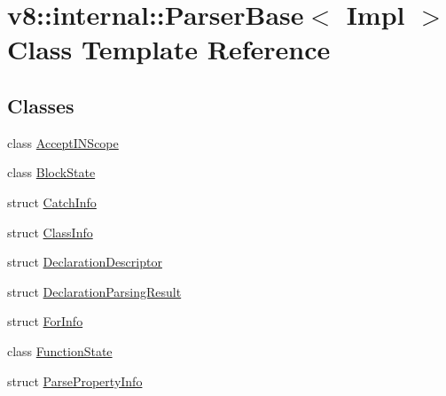 \hypertarget{classv8_1_1internal_1_1ParserBase}{}\section{v8\+:\+:internal\+:\+:Parser\+Base$<$ Impl $>$ Class Template Reference}
\label{classv8_1_1internal_1_1ParserBase}
\subsection*{Classes}
\begin{DoxyCompactItemize}
\item 
class \mbox{\hyperlink{classv8_1_1internal_1_1ParserBase_1_1AcceptINScope}{Accept\+I\+N\+Scope}}
\item 
class \mbox{\hyperlink{classv8_1_1internal_1_1ParserBase_1_1BlockState}{Block\+State}}
\item 
struct \mbox{\hyperlink{structv8_1_1internal_1_1ParserBase_1_1CatchInfo}{Catch\+Info}}
\item 
struct \mbox{\hyperlink{structv8_1_1internal_1_1ParserBase_1_1ClassInfo}{Class\+Info}}
\item 
struct \mbox{\hyperlink{structv8_1_1internal_1_1ParserBase_1_1DeclarationDescriptor}{Declaration\+Descriptor}}
\item 
struct \mbox{\hyperlink{structv8_1_1internal_1_1ParserBase_1_1DeclarationParsingResult}{Declaration\+Parsing\+Result}}
\item 
struct \mbox{\hyperlink{structv8_1_1internal_1_1ParserBase_1_1ForInfo}{For\+Info}}
\item 
class \mbox{\hyperlink{classv8_1_1internal_1_1ParserBase_1_1FunctionState}{Function\+State}}
\item 
struct \mbox{\hyperlink{structv8_1_1internal_1_1ParserBase_1_1ParsePropertyInfo}{Parse\+Property\+Info}}
\end{DoxyCompactItemize}
